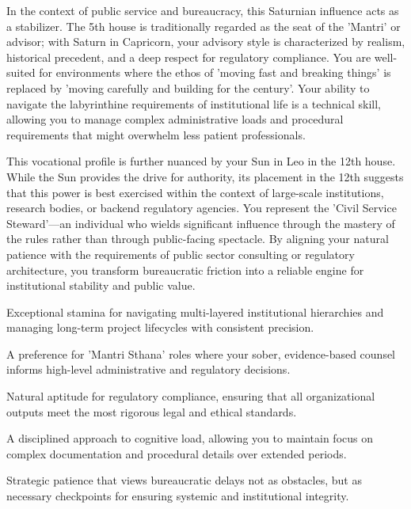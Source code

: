 {\fontsize{9}{13}\selectfont In the context of public service and bureaucracy, this Saturnian influence acts as a stabilizer. The 5th house is traditionally regarded as the seat of the 'Mantri' or advisor; with Saturn in Capricorn, your advisory style is characterized by realism, historical precedent, and a deep respect for regulatory compliance. You are well-suited for environments where the ethos of 'moving fast and breaking things' is replaced by 'moving carefully and building for the century'. Your ability to navigate the labyrinthine requirements of institutional life is a technical skill, allowing you to manage complex administrative loads and procedural requirements that might overwhelm less patient professionals.}\par\vspace{1.8mm}

{\fontsize{9}{13}\selectfont This vocational profile is further nuanced by your Sun in Leo in the 12th house. While the Sun provides the drive for authority, its placement in the 12th suggests that this power is best exercised within the context of large-scale institutions, research bodies, or backend regulatory agencies. You represent the 'Civil Service Steward'---an individual who wields significant influence through the mastery of the rules rather than through public-facing spectacle. By aligning your natural patience with the requirements of public sector consulting or regulatory architecture, you transform bureaucratic friction into a reliable engine for institutional stability and public value.}\par\vspace{1.8mm}

\begin{diamondlist}
  \item {\fontsize{8.5}{12}\selectfont Exceptional stamina for navigating multi-layered institutional hierarchies and managing long-term project lifecycles with consistent precision.}
  \item {\fontsize{8.5}{12}\selectfont A preference for 'Mantri Sthana' roles where your sober, evidence-based counsel informs high-level administrative and regulatory decisions.}
  \item {\fontsize{8.5}{12}\selectfont Natural aptitude for regulatory compliance, ensuring that all organizational outputs meet the most rigorous legal and ethical standards.}
  \item {\fontsize{8.5}{12}\selectfont A disciplined approach to cognitive load, allowing you to maintain focus on complex documentation and procedural details over extended periods.}
  \item {\fontsize{8.5}{12}\selectfont Strategic patience that views bureaucratic delays not as obstacles, but as necessary checkpoints for ensuring systemic and institutional integrity.}
\end{diamondlist}

